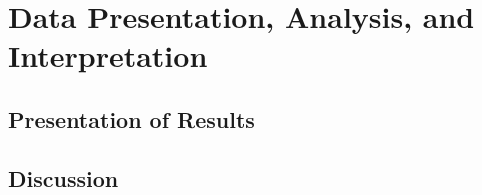 \documentclass[../main]{subfiles}
\begin{document}
\chapter{Data Presentation, Analysis, and Interpretation}

\section{Presentation of Results}

\section{Discussion}
\end{document}
